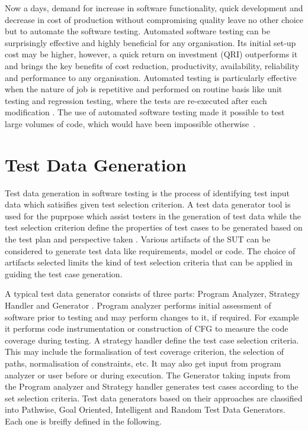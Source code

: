 Now a days, demand for increase in software functionality, quick development and decrease in cost of production without compromising quality leave no other choice but to automate the software testing. Automated software testing can be surprisingly effective and highly beneﬁcial for any organisation. Its initial set-up cost may be higher, however, a quick return on investment (QRI) outperforms it and brings the key beneﬁts of cost reduction, productivity, availability, reliability and performance to any organisation. Automated testing is particularly effective when the nature of job is repetitive and performed on routine basis like unit testing and regression testing, where the tests are re-executed after each modification \cite{huang2003automated}. The use of automated software testing made it possible to test large volumes of code, which would have been impossible otherwise~\cite{ramamoorthy1975testing}.

\section{Test Data Generation}
Test data generation in software testing is the process of identifying test input data which satisifies given test selection criterion. A test data generator tool is used for the puprpose which assist testers in the generation of test data while the test selection criterion define the properties of test cases to be generated based on the test plan and perspective taken \cite{korel1990}. Various artifacts of the SUT can be considered to generate test data like requirements, model or code. The choice of artifacts selected limits the kind of test selection criteria that can be applied in guiding the test case generation. 

A typical test data generator consists of three parts: Program Analyzer, Strategy Handler and Generator \cite{edvardsson1999survey}. Program analyzer performs initial assessment of software prior to testing and may perform changes to it, if required. For example it performs code instrumentation or construction of CFG to measure the code coverage during testing. A strategy handler define the test case selection criteria. This may include the formalisation of test coverage criterion, the selection of paths, normalisation of constraints, etc. It may also get input from   program analyzer or user before or during execution. The Generator taking inputs from the Program analyzer and Strategy handler generates test cases according to the set selection criteria.  Test data generators based on their approaches are classified into Pathwise, Goal Oriented, Intelligent and Random Test Data Generators. Each one is breifly defined in the following.


